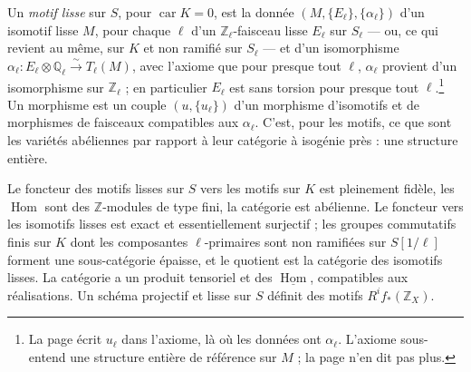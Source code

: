 \documentclass[11pt,a4paper]{article}
\begin{document}
Un \emph{motif lisse} sur $S$, pour $\operatorname{car} K = 0$, est la donnée
$(M, \{E_{\ell}\}, \{\alpha_{\ell}\})$ d'un isomotif lisse $M$, pour chaque $\ell$ d'un
$\mathbb{Z}_{\ell}$-faisceau lisse $E_{\ell}$ sur $S_{\ell}$ --- ou, ce qui revient au
même, sur $K$ et non ramifié sur $S_{\ell}$ --- et d'un isomorphisme
$\alpha_{\ell} \colon E_{\ell} \otimes \mathbb{Q}_{\ell} \xrightarrow{\sim} T_{\ell}(M)$,
avec l'axiome que pour presque tout $\ell$, $\alpha_{\ell}$ provient d'un isomorphisme
sur $\mathbb{Z}_{\ell}$ ; en particulier $E_{\ell}$ est sans torsion pour presque tout
$\ell$.\footnote{La page écrit $u_{\ell}$ dans l'axiome, là où les données ont
$\alpha_{\ell}$. L'axiome sous-entend une structure entière de référence sur $M$ ;
la page n'en dit pas plus.} Un morphisme est un couple $(u, \{u_{\ell}\})$ d'un
morphisme d'isomotifs et de morphismes de faisceaux compatibles aux
$\alpha_{\ell}$. C'est, pour les motifs, ce que sont les variétés abéliennes par
rapport à leur catégorie à isogénie près : une structure entière.

Le foncteur des motifs lisses sur $S$ vers les motifs sur $K$ est pleinement fidèle,
les $\operatorname{Hom}$ sont des $\mathbb{Z}$-modules de type fini, la catégorie est
abélienne. Le foncteur vers les isomotifs lisses est exact et essentiellement
surjectif ; les groupes commutatifs finis sur $K$ dont les composantes
$\ell$-primaires sont non ramifiées sur $S[1/\ell]$ forment une sous-catégorie épaisse,
et le quotient est la catégorie des isomotifs lisses. La catégorie a un produit
tensoriel et des $\underline{\operatorname{Hom}}$, compatibles aux réalisations. Un
schéma projectif et lisse sur $S$ définit des motifs $R^{i}f_{*}(\mathbb{Z}_{X})$.
\end{document}
